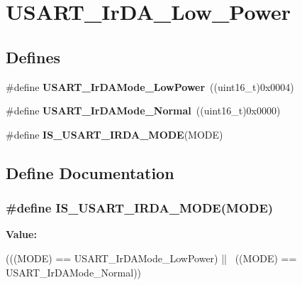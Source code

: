 \hypertarget{group__USART__IrDA__Low__Power}{
\section{USART\_\-IrDA\_\-Low\_\-Power}
\label{group__USART__IrDA__Low__Power}
}
\subsection*{Defines}
\begin{DoxyCompactItemize}
\item 
\hypertarget{group__USART__IrDA__Low__Power_ga00c2635d0e6ca1a5b158f1c1673e862f}{
\#define {\bfseries USART\_\-IrDAMode\_\-LowPower}~((uint16\_\-t)0x0004)}
\label{group__USART__IrDA__Low__Power_ga00c2635d0e6ca1a5b158f1c1673e862f}

\item 
\hypertarget{group__USART__IrDA__Low__Power_ga796cd5451deb896741206986bd6d03e6}{
\#define {\bfseries USART\_\-IrDAMode\_\-Normal}~((uint16\_\-t)0x0000)}
\label{group__USART__IrDA__Low__Power_ga796cd5451deb896741206986bd6d03e6}

\item 
\#define {\bfseries IS\_\-USART\_\-IRDA\_\-MODE}(MODE)
\end{DoxyCompactItemize}


\subsection{Define Documentation}
\hypertarget{group__USART__IrDA__Low__Power_ga7790838ff8ee71089da2c0e5bceee569}{
\subsubsection[{IS\_\-USART\_\-IRDA\_\-MODE}]{\setlength{\rightskip}{0pt plus 5cm}\#define IS\_\-USART\_\-IRDA\_\-MODE(MODE)}}
\label{group__USART__IrDA__Low__Power_ga7790838ff8ee71089da2c0e5bceee569}
{\bfseries Value:}
\begin{DoxyCode}
(((MODE) == USART_IrDAMode_LowPower) || \
                                  ((MODE) == USART_IrDAMode_Normal))
\end{DoxyCode}
